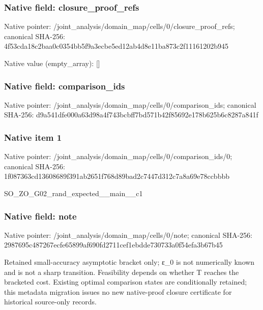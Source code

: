 \documentclass[10pt,a4paper]{article}
\begin{document}
\subsubsection{Native field: closure\_\allowbreak{}proof\_\allowbreak{}refs}
Native pointer: /joint\_\allowbreak{}analysis/domain\_\allowbreak{}map/cells/0/closure\_\allowbreak{}proof\_\allowbreak{}refs; canonical SHA-256: 4f53cda18c2baa0c0354bb5f9a3ecbe5ed12ab4d8e11ba873c2f11161202b945

Native value (empty\_\allowbreak{}array): []

\subsubsection{Native field: comparison\_\allowbreak{}ids}
Native pointer: /joint\_\allowbreak{}analysis/domain\_\allowbreak{}map/cells/0/comparison\_\allowbreak{}ids; canonical SHA-256: d9a541dfe000a63d98a4f743bcbff7bd571b42f85692e178b625b6c8287a841f

\subsubsection{Native item 1}
Native pointer: /joint\_\allowbreak{}analysis/domain\_\allowbreak{}map/cells/0/comparison\_\allowbreak{}ids/0; canonical SHA-256: 1f087363cd13608689f391ab2651f768d89bad2c7447d312c7a8a69e78ccbbbb

\begingroup\raggedright\sloppy SO\_\allowbreak{}ZO\_\allowbreak{}G02\_\allowbreak{}rand\_\allowbreak{}expected\_\allowbreak{}\_\allowbreak{}main\_\allowbreak{}\_\allowbreak{}c1\par\endgroup

\subsubsection{Native field: note}
Native pointer: /joint\_\allowbreak{}analysis/domain\_\allowbreak{}map/cells/0/note; canonical SHA-256: 2987695c487267ecfe65899af690fd2711cef1ebdde730733a0f54efa3b67b45

\begingroup\raggedright\sloppy Retained small-accuracy asymptotic bracket only;\allowbreak{} {\AtlasUnicodeText ε}\allowbreak{}\_\allowbreak{}0 is not numerically known and is not a sharp transition. Feasibility depends on whether T reaches the bracketed cost. Existing optimal comparison states are conditionally retained;\allowbreak{} this metadata migration issues no new native-proof closure certificate for historical source-only records.\par\endgroup
\end{document}
